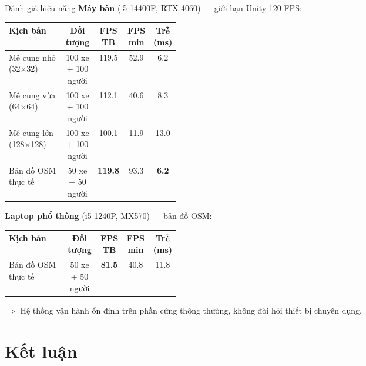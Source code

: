 \documentclass[t, aspectratio=169]{beamer} %
\begin{document}
	\begin{frame}{Đánh giá hiệu năng}
		\textbf{Máy bàn} (i5-14400F, RTX 4060) --- giới hạn Unity 120 FPS:

		\vspace{0.3em}
		{\small
		\begin{tabular}{|p{0.34\linewidth}|c|c|c|c|}
			\hline
			\textbf{Kịch bản} & \textbf{Đối tượng} & \textbf{FPS TB} & \textbf{FPS min} & \textbf{Trễ (ms)} \\
			\hline
			Mê cung nhỏ (32$\times$32)   & 100 xe + 100 người & 119.5 & 52.9 & 6.2 \\ \hline
			Mê cung vừa (64$\times$64)   & 100 xe + 100 người & 112.1 & 40.6 & 8.3 \\ \hline
			Mê cung lớn (128$\times$128) & 100 xe + 100 người & 100.1 & 11.9 & 13.0 \\ \hline
			Bản đồ OSM thực tế           &  50 xe + 50 người  & \textbf{119.8} & 93.3 & \textbf{6.2} \\ \hline
		\end{tabular}}

		\vspace{0.5em}
		\textbf{Laptop phổ thông} (i5-1240P, MX570) --- bản đồ OSM:

		\vspace{0.3em}
		{\small
		\begin{tabular}{|p{0.34\linewidth}|c|c|c|c|}
			\hline
			\textbf{Kịch bản} & \textbf{Đối tượng} & \textbf{FPS TB} & \textbf{FPS min} & \textbf{Trễ (ms)} \\
			\hline
			Bản đồ OSM thực tế & 50 xe + 50 người & \textbf{81.5} & 40.8 & 11.8 \\ \hline
		\end{tabular}}

		\vspace{0.4em}
		$\Rightarrow$ Hệ thống vận hành ổn định trên phần cứng thông thường, không đòi hỏi thiết bị chuyên dụng.
	\end{frame}

	\section{Kết luận}
\end{document}
